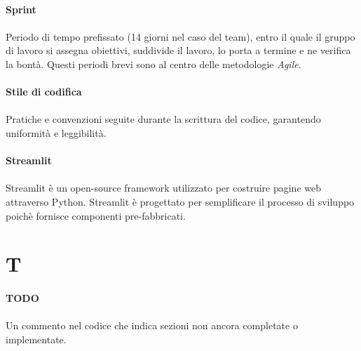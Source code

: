 \documentclass[10pt, a4paper]{article}
\begin{document}
\vspace{2em}
\paragraph{Sprint}\noindent\hrulefill
\paragraph{}Periodo di tempo prefissato (14 giorni nel caso del team), entro il quale il gruppo di lavoro si assegna obiettivi, suddivide il lavoro, lo porta a termine e ne verifica la bontà. Questi periodi brevi sono al centro delle metodologie \textit{Agile\pg}.

\vspace{2em}
\paragraph{Stile di codifica}\noindent\hrulefill
\paragraph{}Pratiche e convenzioni seguite durante la scrittura del codice, garantendo uniformità e leggibilità.


\paragraph{Streamlit}\noindent\hrulefill
\paragraph{}Streamlit è un open-source framework utilizzato per costruire pagine web attraverso Python. Streamlit è progettato per semplificare il processo di sviluppo poichè fornisce componenti pre-fabbricati.

\newpage
\section{T}
\vspace{2em}
\paragraph{TODO}\noindent\hrulefill
\paragraph{}Un commento nel codice che indica sezioni non ancora completate o implementate.
\end{document}
